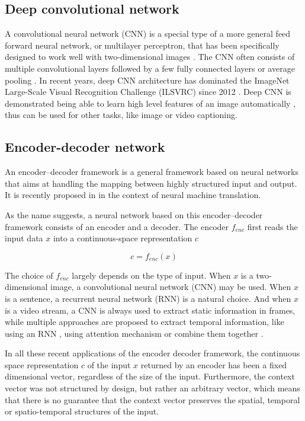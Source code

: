 \subsection{Deep convolutional network}
A convolutional neural network (CNN) is a special type of a more general feed forward neural network, or multilayer perceptron, that has been specifically designed to work well with two-dimensional images \cite{lecun1998gradient}. The CNN often consists of multiple convolutional layers followed by a few fully connected layers or average pooling \cite{lin2013network,szegedy2015going}. In recent years, deep CNN architecture has dominated the ImageNet Large-Scale Visual Recognition Challenge (ILSVRC) since 2012 \cite{krizhevsky2012imagenet,simonyan2014very,szegedy2015going,he2015deep}. Deep CNN is demonstrated being able to learn high level features of an image automatically \cite{zeiler2014visualizing}, thus can be used for other tasks, like image or video captioning.

\subsection{Encoder-decoder network}
An encoder–decoder framework is a general framework based on neural networks that aims at handling the mapping between highly structured input and output. It is recently proposed in \cite{sutskever2014sequence,cho2014learning} in the context of neural machine translation.

As the name suggests, a neural network based on this encoder–decoder framework consists of an encoder and a decoder. The encoder $f_{enc}$ first reads the input data $x$ into a continuous-space representation $c$

\begin{equation}
c=f_{enc}(x)
\end{equation}

The choice of $f_{enc}$ largely depends on the type of input. When $x$ is a two-dimensional image, a convolutional neural network (CNN) may be used. When $x$ is a sentence, a recurrent neural network (RNN) is a natural choice. And when $x$ is a video stream, a CNN is always used to extract static information in frames, while multiple approaches are proposed to extract temporal information, like using an RNN \cite{venugopalan2015sequence}, using attention mechanism \cite{yao2015describing} or combine them together \cite{pan2015hierarchical}.

In all these recent applications of the encoder decoder framework, the continuous space representation $c$ of the input $x$ returned by an encoder has been a fixed dimensional vector, regardless of the size of the input. Furthermore, the context vector was not structured by design, but rather an arbitrary vector, which means that there is no guarantee that the context vector preserves the spatial, temporal or spatio-temporal structures of the input.

